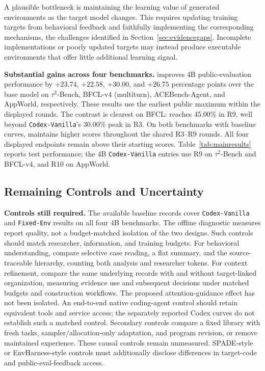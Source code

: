A plausible bottleneck is maintaining the learning value of generated
environments as the target model changes. This requires updating training
targets from behavioral feedback and faithfully implementing the corresponding
mechanisms, the challenges identified in Section~\ref{sec:evidencegaps}.
Incomplete implementations or poorly updated targets may instead produce
executable environments that offer little additional learning signal.

\textbf{Substantial gains across four benchmarks.}\quad
\method{} improves 4B public-evaluation performance by $+23.74$, $+22.58$,
$+30.00$, and $+26.75$ percentage points over the base model on $\tau^2$-Bench,
BFCL-v4 (multiturn), ACEBench-Agent, and AppWorld, respectively. These results
use the earliest public maximum within the displayed rounds. The contrast is
clearest on BFCL: \method{} reaches 45.00\% in R9, well beyond
\texttt{Codex-Vanilla}'s 30.00\% peak in R3. On both benchmarks with baseline
curves, \method{} maintains higher scores throughout the shared R3--R9 rounds.
All four displayed endpoints remain above their starting scores.
Table~\ref{tab:mainresults} reports test performance; the 4B
\texttt{Codex-Vanilla} entries use R9 on $\tau^2$-Bench and BFCL-v4,
and R10 on AppWorld.




\subsection{Remaining Controls and Uncertainty}

\textbf{Controls still required.}\quad
The available baseline records cover \texttt{Codex-Vanilla} and \texttt{Fixed-Env} results on all four 4B benchmarks. The offline diagnostic measures report quality, not a budget-matched isolation of the two designs. Such controls should match researcher, information, and training budgets. For behavioral understanding, compare selective case reading, a flat summary, and the source-traceable hierarchy, counting both analysis and researcher tokens. For context refinement, compare the same underlying records with and without target-linked organization, measuring evidence use and subsequent decisions under matched budgets and construction workflows. The proposed attention-guidance effect has not been isolated. An end-to-end native coding-agent control should retain equivalent tools and service access; the separately reported Codex curves do not establish such a matched control. Secondary controls compare a fixed library with fresh tasks, sampler/allocation-only adaptation, and program revision, or remove maintained experience. These causal controls remain unmeasured. SPADE-style or EnvHarness-style controls must additionally disclose differences in target-code and public-eval-feedback access.


